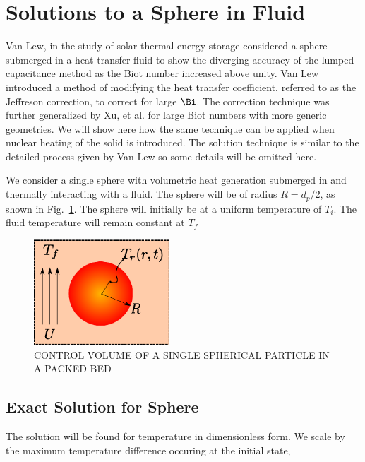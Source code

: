 \section{Solutions to a Sphere in Fluid}
Van Lew\cite{VanLew2010}, in the study of solar thermal energy storage considered a sphere submerged in a heat-transfer fluid to show the diverging accuracy of the lumped capacitance method as the Biot number increased above unity. Van Lew introduced a method of modifying the heat transfer coefficient, referred to as the Jeffreson correction, to correct for large $\Bi$. The correction technique was further generalized by Xu, et al.\cite{Xu2012} for large Biot numbers with more generic geometries. We will show here how the same technique can be applied when nuclear heating of the solid is introduced. The solution technique is similar to the detailed process given by Van Lew\cite{VanLew2010} so some details will be omitted here.

We consider a single sphere with volumetric heat generation submerged in and thermally interacting with a fluid. The sphere will be of radius $R=d_p/2$, as shown in Fig.~\ref{fig:ParticleControlVolume}. The sphere will initially be at a uniform temperature of $T_i$. The fluid temperature will remain constant at $T_f$

\begin{figure}[ht]
	\centering
		\includegraphics[width=2in]{chapters/figures/ParticleControlVolume}
	\caption[Control volume of single spherical particle in a packed bed]{CONTROL VOLUME OF A SINGLE SPHERICAL PARTICLE IN A PACKED BED}
	\label{fig:ParticleControlVolume}
\end{figure}


\subsection{Exact Solution for Sphere}

The solution will be found for temperature in dimensionless form. We scale by the maximum temperature difference occuring at the initial state,

